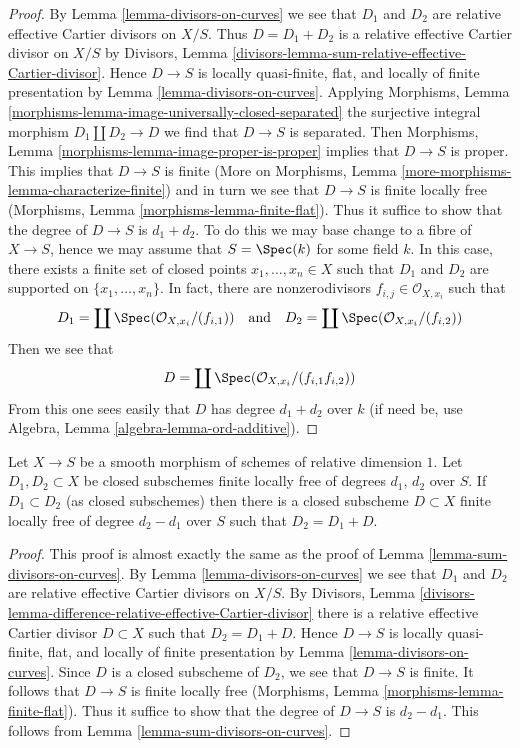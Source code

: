 \begin{proof}
By Lemma \ref{lemma-divisors-on-curves} we see that $D_1$
and $D_2$ are relative effective Cartier divisors on $X/S$.
Thus $D = D_1 + D_2$ is a relative effective Cartier divisor
on $X/S$ by
Divisors, Lemma \ref{divisors-lemma-sum-relative-effective-Cartier-divisor}.
Hence $D \to S$ is locally quasi-finite, flat, and
locally of finite presentation by
Lemma \ref{lemma-divisors-on-curves}.
Applying
Morphisms, Lemma \ref{morphisms-lemma-image-universally-closed-separated}
the surjective integral morphism $D_1 \amalg D_2 \to D$
we find that $D \to S$ is separated. Then
Morphisms, Lemma \ref{morphisms-lemma-image-proper-is-proper}
implies that $D \to S$ is proper.
This implies that $D \to S$ is finite
(More on Morphisms, Lemma \ref{more-morphisms-lemma-characterize-finite})
and in turn we see that $D \to S$ is finite locally free
(Morphisms, Lemma \ref{morphisms-lemma-finite-flat}).
Thus it suffice to show that the degree of $D \to S$ is $d_1 + d_2$.
To do this we may base change to a fibre of $X \to S$, hence we may
assume that $S = \Spec(k)$ for some field $k$.
In this case, there exists a finite set of closed points
$x_1, \ldots, x_n \in X$ such that $D_1$ and $D_2$
are supported on $\{x_1, \ldots, x_n\}$.
In fact, there are nonzerodivisors $f_{i, j} \in \mathcal{O}_{X, x_i}$
such that
$$
D_1 = \coprod \Spec(\mathcal{O}_{X, x_i}/(f_{i, 1}))
\quad\text{and}\quad
D_2 = \coprod \Spec(\mathcal{O}_{X, x_i}/(f_{i, 2}))
$$
Then we see that
$$
D = \coprod \Spec(\mathcal{O}_{X, x_i}/(f_{i, 1}f_{i, 2}))
$$
From this one sees easily that $D$ has degree $d_1 + d_2$
over $k$ (if need be, use Algebra, Lemma \ref{algebra-lemma-ord-additive}).
\end{proof}

\begin{lemma}
\label{lemma-difference-divisors-on-curves}
Let $X \to S$ be a smooth morphism of schemes of relative dimension $1$.
Let $D_1, D_2 \subset X$ be closed subschemes finite locally free of
degrees $d_1$, $d_2$ over $S$. If $D_1 \subset D_2$ (as closed subschemes)
then there is a closed subscheme $D \subset X$ finite locally free of
degree $d_2 - d_1$ over $S$ such that $D_2 = D_1 + D$.
\end{lemma}

\begin{proof}
This proof is almost exactly the same as the proof of
Lemma \ref{lemma-sum-divisors-on-curves}.
By Lemma \ref{lemma-divisors-on-curves} we see that $D_1$
and $D_2$ are relative effective Cartier divisors on $X/S$.
By Divisors, Lemma
\ref{divisors-lemma-difference-relative-effective-Cartier-divisor}
there is a relative effective Cartier divisor $D \subset X$
such that $D_2 = D_1 + D$. Hence $D \to S$ is locally quasi-finite, flat, and
locally of finite presentation by
Lemma \ref{lemma-divisors-on-curves}.
Since $D$ is a closed subscheme of $D_2$, we see that
$D \to S$ is finite. It follows that $D \to S$ is finite locally free
(Morphisms, Lemma \ref{morphisms-lemma-finite-flat}).
Thus it suffice to show that the degree of $D \to S$ is $d_2 - d_1$.
This follows from Lemma \ref{lemma-sum-divisors-on-curves}.
\end{proof}

